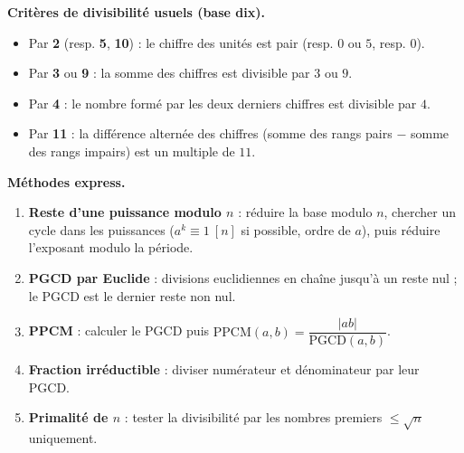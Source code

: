 \documentclass[11pt]{article}
\begin{document}
\begin{propriete}
\textbf{Critères de divisibilité usuels (base dix).}
\begin{itemize}
\item Par \textbf{2} (resp. \textbf{5}, \textbf{10}) : le chiffre des unités est pair (resp. $0$ ou $5$, resp. $0$).
\item Par \textbf{3} ou \textbf{9} : la somme des chiffres est divisible par $3$ ou $9$.
\item Par \textbf{4} : le nombre formé par les deux derniers chiffres est divisible par $4$.
\item Par \textbf{11} : la différence alternée des chiffres (somme des rangs pairs $-$ somme des rangs impairs) est un multiple de $11$.
\end{itemize}

\textbf{Méthodes express.}
\begin{enumerate}
\item \textbf{Reste d'une puissance modulo $n$} : réduire la base modulo $n$, chercher un cycle dans les puissances ($a^k\equiv 1\ [n]$ si possible, ordre de $a$), puis réduire l'exposant modulo la période.
\item \textbf{PGCD par Euclide} : divisions euclidiennes en chaîne jusqu'à un reste nul ; le PGCD est le dernier reste non nul.
\item \textbf{PPCM} : calculer le PGCD puis $\mathrm{PPCM}(a,b)=\dfrac{|ab|}{\mathrm{PGCD}(a,b)}$.
\item \textbf{Fraction irréductible} : diviser numérateur et dénominateur par leur PGCD.
\item \textbf{Primalité de $n$} : tester la divisibilité par les nombres premiers $\le\sqrt{n}$ uniquement.
\end{enumerate}
\end{propriete}
\end{document}

